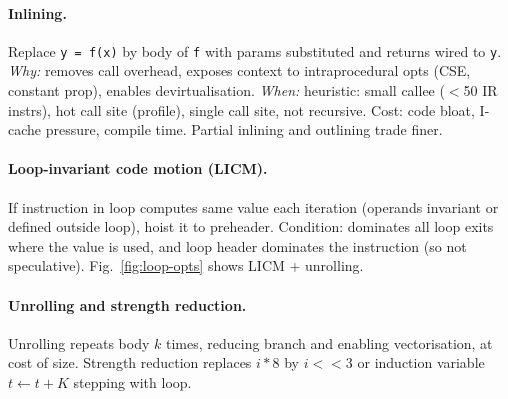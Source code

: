 \paragraph{Inlining.} Replace \texttt{y = f(x)} by body of \texttt{f} with params substituted and returns wired to \texttt{y}. \emph{Why:} removes call overhead, exposes context to intraprocedural opts (CSE, constant prop), enables devirtualisation. \emph{When:} heuristic: small callee ($<$50 IR instrs), hot call site (profile), single call site, not recursive. Cost: code bloat, I-cache pressure, compile time. Partial inlining and outlining trade finer.

\paragraph{Loop-invariant code motion (LICM).} If instruction in loop computes same value each iteration (operands invariant or defined outside loop), hoist it to preheader. Condition: dominates all loop exits where the value is used, and loop header dominates the instruction (so not speculative). Fig.~\ref{fig:loop-opts} shows LICM + unrolling.

\paragraph{Unrolling and strength reduction.} Unrolling repeats body $k$ times, reducing branch and enabling vectorisation, at cost of size. Strength reduction replaces $i*8$ by $i\!<\!<3$ or induction variable $t\gets t+K$ stepping with loop.

